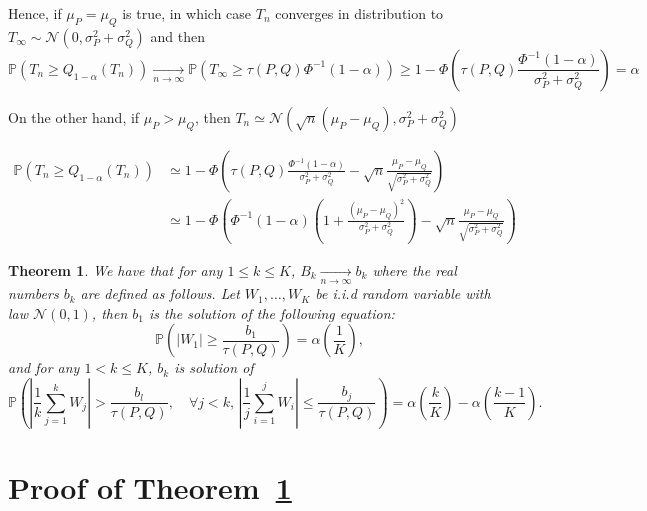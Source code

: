 \documentclass{article}
\theoremstyle{plain}
\newtheorem{Theorem}{Theorem}
\theoremstyle{remark}
\renewcommand{\P}{\mathbb{P}}
\newcommand{\1}{\mathbbm{1}}
\numberwithin{equation}{section}
\begin{document}
 Hence, if $\mu_P = \mu_Q$ is true, in which case $T_n$ converges in distribution to $T_\infty\sim \mathcal{N}(0,\sigma_P^2+\sigma_Q^2 )$ and then
$$\P\left( T_n \ge Q_{1-\alpha}(T_n)\right) \xrightarrow[n \to \infty]{} \P(T_\infty\ge \tau(P,Q)\Phi^{-1}(1-\alpha)) \ge  1-\Phi\left(\tau(P,Q)\frac{\Phi^{-1}(1-\alpha)}{\sigma_P^2+\sigma_Q^2 } \right)=\alpha  $$

On the other hand, if $\mu_P > \mu_Q$, then $T_n \simeq \mathcal{N}(\sqrt{n}(\mu_P-\mu_Q),\sigma_P^2+\sigma_Q^2 ) $

\begin{align*}
\P\left( T_n \ge Q_{1-\alpha}(T_n)\right)&\simeq  1-\Phi\left(\tau(P,Q)\frac{\Phi^{-1}(1-\alpha)}{\sigma_P^2+\sigma_Q^2 }-  \sqrt{n}\frac{\mu_P-\mu_Q}{\sqrt{\sigma_P^2+\sigma_Q^2}} \right)  \\
&\simeq  1-\Phi\left(\Phi^{-1}(1-\alpha)\left(1+\frac{(\mu_P-\mu_Q)^2}{\sigma_P^2+\sigma_Q^2 }\right)-  \sqrt{n}\frac{\mu_P-\mu_Q}{\sqrt{\sigma_P^2+\sigma_Q^2}} \right)
\end{align*}
\begin{Theorem}\label{th:conv_boundary}
We have that for any $1\le k\le K$, $B_k\xrightarrow[n \to \infty]{}b_k$ where the real numbers $b_k$ are defined as follows. Let $W_1,\dots, W_K$ be i.i.d random variable with law $\mathcal{N}(0,1)$, then $b_1$ is the solution of the following equation:
$$ \P\left(\left|W_1 \right|\ge \frac{b_1}{\tau(P,Q)}  \right)=\alpha\left( \frac{1}{K} \right),$$
and for any $1<k\le K$, $b_k$ is solution of
\begin{equation*}
\P\left( \left|\frac{1}{k}\sum_{j=1}^k W_j\right| > \frac{b_l}{\tau(P,Q)}, \quad \forall j<k,\, \left|\frac{1}{j}\sum_{i=1}^j W_i\right| \le \frac{b_j}{\tau(P,Q)} \right)=\alpha\left(\frac{k}{K} \right) - \alpha\left( \frac{k-1}{K}\right).
\end{equation*}

\end{Theorem}
\section{Proof of Theorem~\ref{th:conv_boundary}}
\end{document}
